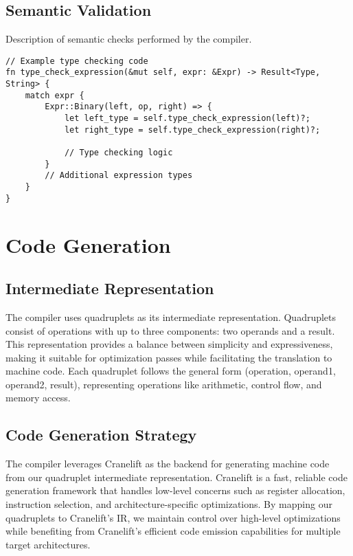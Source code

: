 \documentclass[12pt,a4paper]{article}
\begin{document}
\subsection{Semantic Validation}
Description of semantic checks performed by the compiler.

\begin{lstlisting}[caption={Type Checking Implementation}]
// Example type checking code
fn type_check_expression(&mut self, expr: &Expr) -> Result<Type, String> {
    match expr {
        Expr::Binary(left, op, right) => {
            let left_type = self.type_check_expression(left)?;
            let right_type = self.type_check_expression(right)?;
            
            // Type checking logic
        }
        // Additional expression types
    }
}
\end{lstlisting}

\section{Code Generation}
\subsection{Intermediate Representation}
The compiler uses quadruplets as its intermediate representation. Quadruplets consist of operations with up to three components: two operands and a result. This representation provides a balance between simplicity and expressiveness, making it suitable for optimization passes while facilitating the translation to machine code. Each quadruplet follows the general form (operation, operand1, operand2, result), representing operations like arithmetic, control flow, and memory access.

\subsection{Code Generation Strategy}
The compiler leverages Cranelift as the backend for generating machine code from our quadruplet intermediate representation. Cranelift is a fast, reliable code generation framework that handles low-level concerns such as register allocation, instruction selection, and architecture-specific optimizations. By mapping our quadruplets to Cranelift's IR, we maintain control over high-level optimizations while benefiting from Cranelift's efficient code emission capabilities for multiple target architectures.
\end{document}

